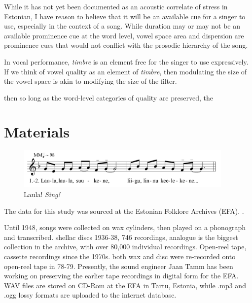 While it has not yet been documented as an acoustic correlate of stress in Estonian, I have reason to believe that it will be an available cue for a singer to use, especially in the context of a song. While duration may or may not be an available prominence cue at the word level, vowel space area and dispersion are prominence cues that would not conflict with the prosodic hierarchy of the song. 

In vocal performance, {\it timbre} is an element free for the singer to use expressively. 
If we think of vowel quality as an element of {\it timbre}, then modulating the size of the vowel space is akin to modifying the size of the filter.

then so long as the word-level categories of quality are preserved, the 


\section{Materials}

\begin{figure}[htbp]
\centering
\includegraphics[width=300pt]{figures/055.png}
\caption{Laula! {\it Sing!}}
\label{default}
\end{figure}




The data for this study was sourced at the Estonian Folklore Archives (EFA). 
\citep{orasEstonianFolkloreArchives2022a}.



Until 1948, songs were collected on wax cylinders, then played on a phonograph and transcribed. shellac discs 1936-38, 746 recordings, 
analogue is the biggest collection in the archive, with over 80,000 individual recordings. Open-reel tape, cassette recordings since the 1970s. 
both wax and disc were re-recorded onto open-reel tape in 78-79.
Presently, the sound engineer Jaan Tamm has been working on preserving the earlier tape recordings in digital form for the EFA. WAV files are stored on CD-Rom at the EFA in Tartu, Estonia, while .mp3 and .ogg lossy formats are uploaded to the internet database. 
%
%




